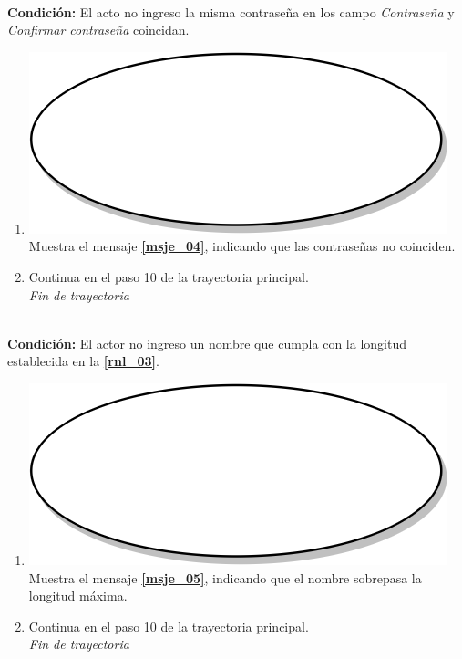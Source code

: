 \textbf{} \\
\textbf{Condición:} El acto no ingreso la misma contraseña en los campo \textit{Contraseña} y \textit{Confirmar contraseña} coincidan.\\
 \begin{enumerate}[label=D\arabic*]
    \item {\includegraphics[scale=.05]{Capitulo3/img/proceso.png} Muestra el mensaje \textbf{\ref{msje_04}}, indicando que las contraseñas no coinciden.}
    \item {Continua en el paso 10 de la trayectoria principal.} \\
    \textit{Fin de trayectoria} \\
\end{enumerate}
 
\textbf{} \\
\textbf{Condición:} El actor no ingreso un nombre que cumpla con la longitud establecida en la \textbf{\ref{rnl_03}}.\\
 \begin{enumerate}[label=E\arabic*]
    \item {\includegraphics[scale=.05]{Capitulo3/img/proceso.png} Muestra el mensaje \textbf{\ref{msje_05}}, indicando que el nombre sobrepasa la longitud máxima.}
    \item {Continua en el paso 10 de la trayectoria principal.} \\
    \textit{Fin de trayectoria} \\
\end{enumerate}

